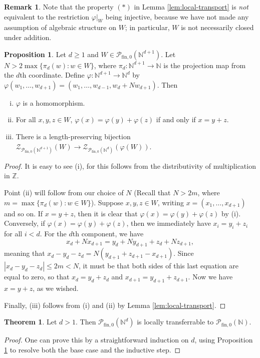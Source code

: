 \documentclass{report}
\newcommand{\NN}{\mathbb{N}}
\renewcommand{\P}{\mathcal{P}}
\newcommand{\ZZ}{\mathbb{Z}}
\newcommand{\Z}{\mathcal{Z}}
\newcommand{\fin}{\textrm{fin}}
\newcommand{\fon}{{\textrm{fin}, 0}}
\renewcommand{\:}{\text{:}}
\newcommand{\PN}{{\P_{\fin,0}(\NN)}}
\theoremstyle{definition}
\newtheorem{prop}[defn]{Proposition}
\newtheorem{thm}[defn]{Theorem}
\newtheorem{rk}[defn]{Remark}
\begin{document}
\begin{rk}
Note that the property $(*)$ in Lemma \ref{lem:local-transport} is \textit{not} equivalent to the restriction $\varphi|_W$ being injective, because we have not made any assumption of algebraic structure on $W$; in particular, $W$ is not necessarily closed under addition. 
\end{rk}

\begin{prop}\label{prop:flattening}
Let $d \ge 1$ and $W\in \P_\fon(\NN^{d+1})$.
Let $N > 2 \max\{\pi_d(w): w\in W\}$, where $\pi_d: \NN^{d+1} \to \NN$ is the projection map from the $d$th coordinate.
Define $\varphi: \NN^{d+1} \to \NN^d$ by $\varphi(w_1,\dots, w_{d+1}) = (w_1,\dots, w_{d-1},w_d + N w_{d+1})$.
Then
\begin{enumerate}[(i)]
	\item $\varphi$ is a homomorphism.
	\item For all $x,y,z\in W$, $\varphi(x) = \varphi(y) + \varphi(z)$ if and only if $x = y + z$.
	\item There is a length-preserving bijection $\Z_{\P_\fon(\NN^{d+1})}(W) \to \Z_{\P_\fon(\NN^d)}(\varphi(W))$.
\end{enumerate}
\end{prop}

\begin{proof}
It is easy to see (i), for this follows from the distributivity of multiplication in $\ZZ$.

Point (ii) will follow from our choice of $N$ (Recall that $N > 2m$, where $m = \max\{\pi_d(w): w\in W\}$).
Suppose $x,y,z\in W$, writing $x = (x_1,\dots, x_{d+1})$ and so on.  
If $x = y+z$, then it is clear that $\varphi(x) = \varphi(y) + \varphi(z)$ by (i).
Conversely, if $\varphi(x) = \varphi(y) + \varphi(z)$, then we immediately have $x_i = y_i + z_i$ for all $i < d$.
For the $d$th component, we have 
\[x_d + Nx_{d+1} = y_d + Ny_{d+1} + z_d + Nz_{d+1}, \]
meaning that $x_d -y_d - z_d = N(y_{d+1}+z_{d+1}-x_{d+1})$.
Since $|x_d - y_d - z_d| \le 2m < N$, it must be that both sides of this last equation are equal to zero, so that $x_d = y_d + z_d$ and $x_{d+1} = y_{d+1}+z_{d+1}$.
Now we have $x = y+z$, as we wished.

Finally, (iii) follows from (i) and (ii) by Lemma \ref{lem:local-transport}.
\end{proof}

\begin{thm}\label{thm:passage-to-Nd}
Let $d > 1$. 
Then $\P_\fon(\NN^d)$ is locally transferrable to $\PN$.
\end{thm}
\begin{proof}
One can prove this by a straightforward induction on $d$, using Proposition \ref{prop:flattening} to resolve both the base case and the inductive step.  
\end{proof}
\end{document}
